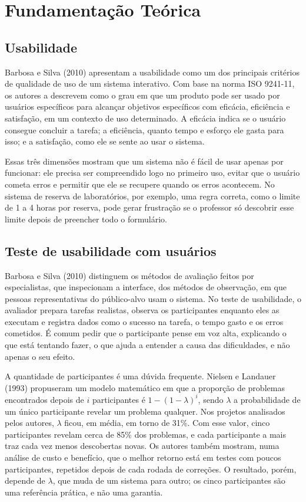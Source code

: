 \documentclass[a4paper,12pt]{article}
\begin{document}
\section{Fundamentação Teórica}

\subsection{Usabilidade}

Barbosa e Silva (2010) apresentam a usabilidade como um dos principais
critérios de qualidade de uso de um sistema interativo. Com base na
norma ISO 9241-11, os autores a descrevem como o grau em que um produto
pode ser usado por usuários específicos para alcançar objetivos
específicos com eficácia, eficiência e satisfação, em um contexto de uso
determinado. A eficácia indica se o usuário consegue concluir a tarefa;
a eficiência, quanto tempo e esforço ele gasta para isso; e a
satisfação, como ele se sente ao usar o sistema.

Essas três dimensões mostram que um sistema não é fácil de usar apenas
por funcionar: ele
precisa ser compreendido logo no primeiro uso, evitar que o usuário
cometa erros e permitir que ele se recupere quando os erros acontecem.
No sistema de reserva de laboratórios, por exemplo, uma regra correta,
como o limite de 1 a 4 horas por reserva, pode gerar frustração se o
professor só descobrir esse limite depois de preencher todo o
formulário.

\subsection{Teste de usabilidade com usuários}

Barbosa e Silva (2010) distinguem os métodos de avaliação feitos por
especialistas, que inspecionam a interface, dos métodos de observação,
em que pessoas representativas do público-alvo usam o sistema. No teste
de usabilidade, o avaliador prepara tarefas realistas, observa os
participantes enquanto eles as executam e registra dados como o sucesso
na tarefa, o tempo gasto e os erros cometidos. É comum pedir que o
participante pense em voz alta, explicando o que está tentando fazer, o
que ajuda a entender a causa das dificuldades, e não apenas o seu
efeito.

A quantidade de participantes é uma dúvida frequente. Nielsen e
Landauer (1993) propuseram um modelo matemático em que a proporção de
problemas encontrados depois de $i$ participantes é
$1-(1-\lambda)^{i}$, sendo $\lambda$ a probabilidade de um único
participante revelar um problema qualquer. Nos projetos analisados
pelos autores, $\lambda$ ficou, em média, em torno de 31\%. Com esse
valor, cinco participantes revelam cerca de 85\% dos problemas, e cada
participante a mais traz cada vez menos descobertas novas. Os autores
também mostram, numa análise de custo e benefício, que o melhor retorno
está em testes com poucos participantes, repetidos depois de cada
rodada de correções. O resultado, porém, depende de $\lambda$, que muda
de um sistema para outro; os cinco participantes são uma referência
prática, e não uma garantia.
\end{document}
